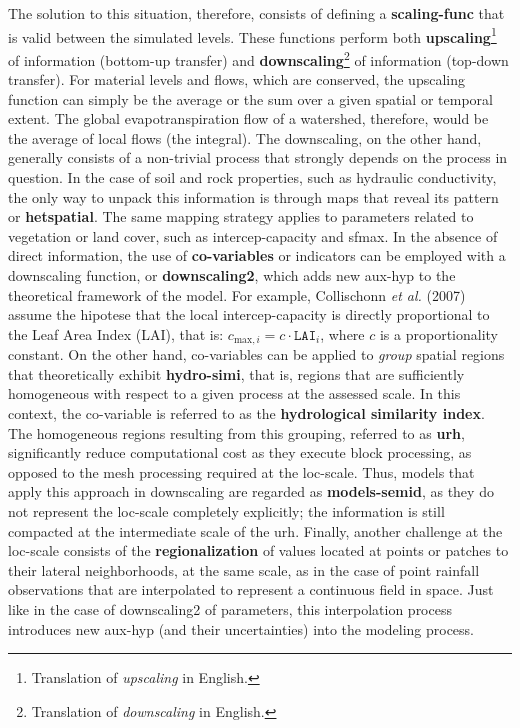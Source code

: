 \documentclass[./main_en.tex]{subfiles}
\begin{document}
\par The solution to this situation, therefore, consists of defining a \textbf{\gls{scaling-func}} that is valid between the simulated levels. These functions perform both \textbf{\gls{upscaling}}\footnote{Translation of \textit{upscaling} in English.} of information (bottom-up transfer) and \textbf{\gls{downscaling}}\footnote{Translation of \textit{downscaling} in English.} of information (top-down transfer). For material levels and flows, which are conserved, the \gls{upscaling} function can simply be the average or the sum over a given spatial or temporal extent. The global evapotranspiration flow of a watershed, therefore, would be the average of local flows (the integral). The \gls{downscaling}, on the other hand, generally consists of a non-trivial process that strongly depends on the process in question. In the case of soil and rock properties, such as hydraulic conductivity, the only way to unpack this information is through maps that reveal its pattern or \textbf{\gls{hetspatial}}. The same mapping strategy applies to \gls{parameters} related to vegetation or land cover, such as \gls{intercep-capacity} and \gls{sfmax}. In the absence of direct information, the use of \textbf{co-variables} or indicators can be employed with a \gls{downscaling} function, or \textbf{\gls{downscaling2}}, which adds new \gls{aux-hyp} to the theoretical framework of the \gls{model}. For example, Collischonn \textit{et al.} (2007) \cite{Collischonn2007} assume the \gls{hipotese} that the local \gls{intercep-capacity} is directly proportional to the Leaf Area Index (LAI), that is: $c_{\text{max}, i} = c \cdot \texttt{LAI}_{i}$, where $c$ is a proportionality constant. On the other hand, co-variables can be applied to \textit{group} spatial regions that theoretically exhibit \textbf{\gls{hydro-simi}}, that is, regions that are sufficiently homogeneous with respect to a given process at the assessed scale. In this context, the co-variable is referred to as the \textbf{hydrological similarity index}. The homogeneous regions resulting from this grouping, referred to as \textbf{\gls{urh}}, significantly reduce computational cost as they execute block processing, as opposed to the mesh processing required at the \gls{loc-scale}. Thus, models that apply this approach in \gls{downscaling} are regarded as \textbf{\gls{models-semid}}, as they do not represent the \gls{loc-scale} completely explicitly; the information is still compacted at the intermediate scale of the \gls{urh}. Finally, another challenge at the \gls{loc-scale} consists of the \textbf{\gls{regionalization}} of values located at points or patches to their lateral neighborhoods, at the same scale, as in the case of point rainfall observations that are interpolated to represent a continuous field in space. Just like in the case of \gls{downscaling2} of \gls{parameters}, this interpolation process introduces new \gls{aux-hyp} (and their uncertainties) into the modeling process.
\end{document}
